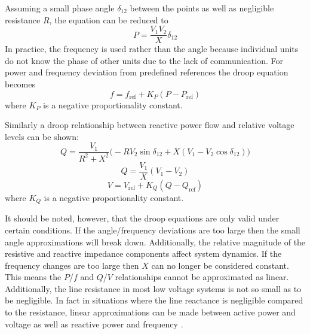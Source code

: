 Assuming a small phase angle $\delta_{12}$ between the points as well as negligible resistance $R$, the equation can be reduced to 
\begin{equation}
P = \frac{V_1V_2}{X}\delta_{12}
\end{equation}
In practice, the frequency is used rather than the angle because individual units do not know the phase of other units due to the lack of communication. For power and frequency deviation from predefined references the droop equation becomes
\begin{equation}
f = f_{\text{ref}} + K_P\left(P - P_{\text{ref}}\right)
\end{equation}
where $K_P$ is a negative proportionality constant. 



Similarly a droop relationship between reactive power flow and relative voltage levels can be shown:
\begin{equation}
Q = \frac{V_1}{R^2 + X^2} \big( -R V_2 \sin{\delta_{12}} + X \left(V_1 - V_2 \cos{\delta_{12}}\right) \big)
\end{equation}
\begin{equation}
Q = \frac{V_1}{X} \left( V_1 - V_2 \right)
\end{equation}
\begin{equation}
V = V_{\text{ref}} + K_Q \left( Q - Q_{\text{ref}} \right)
\end{equation}
where $K_Q$ is a negative proportionality constant. 

It should be noted, however, that the droop equations are only valid under certain conditions. If the angle\slash frequency deviations are too large then the small angle approximations will break down. Additionally, the relative magnitude of the resistive and reactive impedance components affect system dynamics. If the frequency changes are too large then $X$ can no longer be considered constant. This means the $P$\slash $f$ and $Q$\slash $V$ relationships cannot be approximated as linear. Additionally, the line resistance in most low voltage systems is not so small as to be negligible. In fact in situations where the line reactance is negligible compared to the resistance, linear approximations can be made between active power and voltage as well as reactive power and frequency \cite{YunWeiLi2009}.


